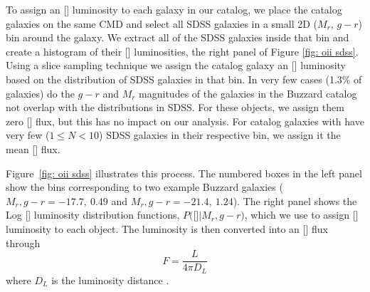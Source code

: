 \documentclass[fleqn,usenatbib]{mnras}
\begin{document}
To assign an [] luminosity to each galaxy in our catalog, we place the catalog galaxies on the same CMD and select all SDSS galaxies in a small 2D ($M_r$, $g-r$) bin around the galaxy. We extract all of the SDSS galaxies inside that bin and create a histogram of their [] luminosities, the right panel of Figure \ref{fig: oii sdss}. Using a slice sampling technique \citep{Neal1997} we assign the catalog galaxy an [] luminosity based on the distribution of SDSS galaxies in that bin. In very few cases (1.3\% of galaxies) do the $g-r$ and $M_r$ magnitudes of the galaxies in the Buzzard catalog not overlap with the distributions in SDSS. For these objects, we assign them zero [] flux, but this has no impact on our analysis. For catalog galaxies with have very few ($1\leq N<10$) SDSS galaxies in their respective bin, we assign it the mean [] flux. 

Figure~\ref{fig: oii sdss} illustrates this process. The numbered boxes in the left panel show the bins corresponding to two example Buzzard galaxies ($M_r, g-r = -17.7,~0.49$ and $M_r, g-r = -21.4,~1.24$). The right panel shows the Log [] luminosity distribution functions, $P($[]$| M_r, g-r)$, which we use to assign [] luminosity to each object. The luminosity is then converted into an [] flux through 
\begin{equation}
	F = \frac{L}{4\pi D_L}
\end{equation}
where $D_L$ is the luminosity distance .
\end{document}
